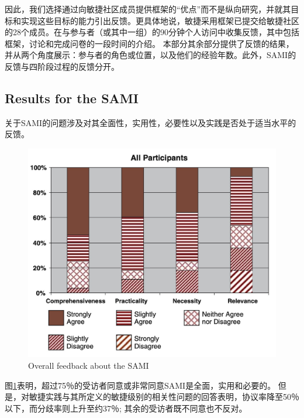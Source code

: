 \documentclass[twocolumn]{svjour3}[]
\begin{document}
因此，我们选择通过向敏捷社区成员提供框架的“优点”而不是纵向研究，并就其目标和实现这些目标的能力引出反馈。更具体地说，敏捷采用框架已提交给敏捷社区的28个成员。在与参与者（或其中一组）的90分钟个人访问中收集反馈，其中包括框架，讨论和完成问卷的一段时间的介绍。 本部分其余部分提供了反馈的结果，并从两个角度展示：参与者的角色或位置，以及他们的经验年数。此外，SAMI的反馈与四阶段过程的反馈分开。

\subsection{Results for the SAMI}

关于SAMI的问题涉及对其全面性，实用性，必要性以及实践是否处于适当水平的反馈。

\begin{figure} [htb]
    \centering
    \includegraphics[width=1.0\linewidth]{img/feedback.jpg}
    \caption{Overall feedback about the SAMI}
    \label{fig.4}
\end{figure}

图\ref{fig.4}表明，超过75％的受访者同意或非常同意SAMI是全面，实用和必要的。 但是，对敏捷实践与其所定义的敏捷级别的相关性问题的回答表明，协议率降至50％以下，而分歧率则上升至约37％; 其余的受访者既不同意也不反对。
\end{document}
